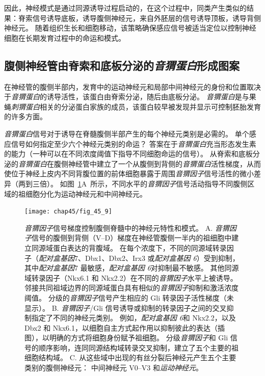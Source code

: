 因此，神经模式是通过同源诱导过程启动的，在这个过程中，同类产生类似的结果：脊索信号诱导底板，诱导腹侧神经元，来自外胚层的信号诱导顶板，诱导背侧神经元。
随着组织生长和细胞移动，该策略确保感应信号被适当定位以控制神经细胞在长期发育过程中的命运和模式。



\subsection{腹侧神经管由脊索和底板分泌的\textit{音猬蛋白}形成图案}

在神经管的腹侧半部内，发育中的运动神经元和局部中间神经元的身份和位置取决于\textit{音猬蛋白}的诱导活性，该蛋白由脊索分泌，随后由底板分泌。
\textit{音猬蛋白}是与果蝇\textit{刺猬蛋白}相关的分泌蛋白家族的成员，该蛋白较早被发现并显示可控制胚胎发育的许多方面。


\textit{音猬蛋白}信号对于诱导在脊髓腹侧半部产生的每个神经元类别是必需的。
单个感应信号如何指定至少六个神经元类别的命运？
答案在于\textit{音猬蛋白}充当形态发生素的能力（一种可以在不同浓度阈值下指导不同细胞命运的信号）。
从脊索和底板分泌的\textit{音猬蛋白}在腹侧神经管中建立了一个从腹侧到背侧的\textit{音猬蛋白}活性梯度，从而使位于神经上皮内不同背腹位置的前体细胞暴露于周围\textit{音猬因子}信号活性的微小差异（两到三倍）。
如图~\ref{fig:45_9}A~所示，不同水平的\textit{音猬因子}信号活动指导不同腹侧区域的祖细胞分化为运动神经元和中间神经元。


\begin{figure}[htbp]
	\centering
	\texttt{[image: chap45/fig\_45\_9]}
	\caption{\textit{音猬因子}信号梯度控制腹侧脊髓中的神经元特性和模式。
		A. \textit{音猬因子}信号的腹侧到背侧（V–D）梯度在神经管腹侧一半内的祖细胞中建立同源域蛋白表达的背腹域。
		在每个浓度下，不同的同源域转录因子（\textit{配对盒基因}7、Dbx1、Dbx2、Irx3 或\textit{配对盒基因 6}）受到抑制，其中\textit{配对盒基因}7 最敏感，\textit{配对盒基因 6}对抑制最不敏感。
		其他同源域转录因子（Nkx6.1 和 Nkx2.2）在不同的\textit{音猬因子}水平上被诱导。
		邻接共同祖域边界的同源域蛋白具有相似的\textit{音猬因子}抑制和激活浓度阈值。
		分级的\textit{音猬因子}信号产生相应的 Gli 转录因子活性梯度（未显示）。
		B. \textit{音猬因子}/Gli 信号诱导或抑制的转录因子之间的交叉抑制指定了不同的神经元类别。
		例如，\textit{配对盒基因 6}和 Nkx2.2，以及 Dbx2 和 Nkx6.1，以细胞自主方式起作用以抑制彼此的表达（插图），以明确的方式将细胞身份赋予祖细胞。
		分级\textit{音猬因子}和 Gli 信号的顺序影响，连同同源结构域转录交叉抑制，建立了五个主要的祖细胞结构域。
		C. 从这些域中出现的有丝分裂后神经元产生五个主要类别的腹侧神经元：
		中间神经元 V0–V3 和\textit{运动神经元}。}
	\label{fig:45_9}
\end{figure}


